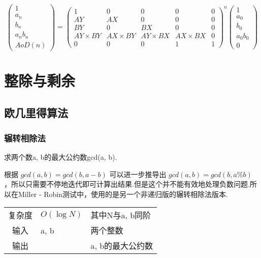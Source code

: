 \[\left( {\begin{array}{*{20}{c}}
1\\
{{a_n}}\\
{{b_n}}\\
{{a_n}{b_n}}\\
{AoD(n)}
\end{array}} \right) = {\left( {\begin{array}{*{20}{c}}
1&0&0&0&0\\
{AY}&{AX}&0&0&0\\
{BY}&0&{BX}&0&0\\
{AY \times BY}&{AX \times BY}&{AY \times BX}&{AX \times BX}&0\\
0&0&0&1&1
\end{array}} \right)^n}\left( {\begin{array}{*{20}{c}}
1\\
{{a_0}}\\
{{b_0}}\\
{{a_0}{b_0}}\\
0
\end{array}} \right)\]




\section{整除与剩余}


    \subsection{欧几里得算法}\small


        \subsubsection{辗转相除法}\small
求两个数a, b的最大公约数gcd(a, b).

根据 $gcd(a, b) = gcd(b, a - b)$ 可以进一步推导出 $gcd(a, b) = gcd(b, a \% b)$ 
，所以只需要不停地迭代即可计算出结果.但是这个并不能有效地处理负数问题.所
以在Miller - Robin测试中，使用的是另一个非递归版的辗转相除法版本.
\begin{longtable}{|c|l|l|}
复杂度 & $O(\log N)$ & 其中N与a, b同阶  \\
输入 & a, b & 两个整数 \\
输出 &  & a, b的最大公约数 \\
\end{longtable}



